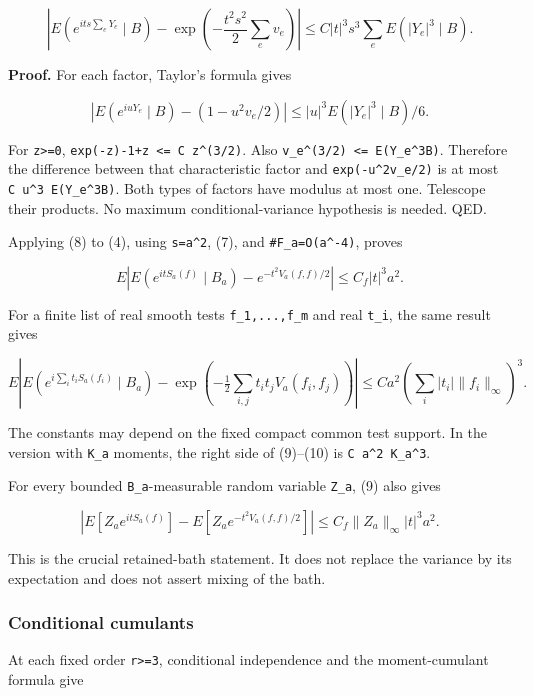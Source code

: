 \documentclass[
  11pt,
]{article}
\begin{document}
\[
 \left|E\left(e^{it s\sum_eY_e}\mid B\right)
       -\exp\left(-\frac{t^2s^2}{2}\sum_ev_e\right)\right|
 \le C|t|^3s^3\sum_eE(|Y_e|^3\mid B).
 \tag{8}
\]

\textbf{Proof.} For each factor, Taylor's formula gives

\[
 |E(e^{iuY_e}\mid B)-(1-u^2v_e/2)|
 \le |u|^3E(|Y_e|^3\mid B)/6.
\]

For \texttt{z\textgreater{}=0},
\texttt{\textbar{}exp(-z)-1+z\textbar{}\ \textless{}=\ C\ z\^{}(3/2)}.
Also
\texttt{v\_e\^{}(3/2)\ \textless{}=\ E(\textbar{}Y\_e\textbar{}\^{}3\textbar{}B)}.
Therefore the difference between that characteristic factor and
\texttt{exp(-u\^{}2v\_e/2)} is at most
\texttt{C\ \textbar{}u\textbar{}\^{}3\ E(\textbar{}Y\_e\textbar{}\^{}3\textbar{}B)}.
Both types of factors have modulus at most one. Telescope their
products. No maximum conditional-variance hypothesis is needed. QED.

Applying (8) to (4), using \texttt{s=a\^{}2}, (7), and
\texttt{\#F\_a=O(a\^{}-4)}, proves

\[
 \boxed{
 E\left|E(e^{itS_a(f)}\mid B_a)-e^{-t^2V_a(f,f)/2}\right|
 \le C_f|t|^3a^2.
 }
 \tag{9}
\]

For a finite list of real smooth tests \texttt{f\_1,...,f\_m} and real
\texttt{t\_i}, the same result gives

\[
 E\left|E\left(e^{i\sum_it_iS_a(f_i)}\mid B_a\right)
 -\exp\left(-\tfrac12\sum_{i,j}t_it_jV_a(f_i,f_j)\right)\right|
 \le C a^2\left(\sum_i|t_i|\|f_i\|_\infty\right)^3.
 \tag{10}
\]

The constants may depend on the fixed compact common test support. In
the version with \texttt{K\_a} moments, the right side of (9)--(10) is
\texttt{C\ a\^{}2\ K\_a\^{}3}.

For every bounded \texttt{B\_a}-measurable random variable
\texttt{Z\_a}, (9) also gives

\[
 \left|E[Z_ae^{itS_a(f)}]-E[Z_ae^{-t^2V_a(f,f)/2}]\right|
 \le C_f\|Z_a\|_\infty|t|^3a^2.
 \tag{11}
\]

This is the crucial retained-bath statement. It does not replace the
variance by its expectation and does not assert mixing of the bath.

\hypertarget{conditional-cumulants}{%
\subsubsection{Conditional cumulants}\label{conditional-cumulants}}

At each fixed order \texttt{r\textgreater{}=3}, conditional independence
and the moment-cumulant formula give
\end{document}
